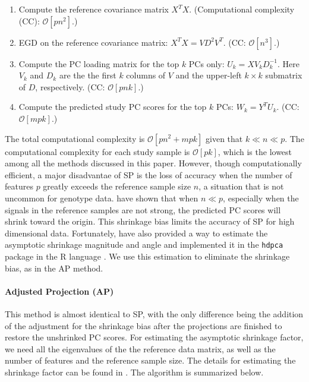 \documentclass{article}
\newcommand{\bO}{\mathcal{O}}
\begin{document}
\begin{enumerate}
\item Compute the reference covariance matrix $X^T X$.
  (Computational complexity (CC): $\bO[pn^2]$.)  
\item EGD on the reference covariance matrix: $X^T X = V D^2 V^T$.
  (CC: $\bO[n^3]$.)
\item Compute the PC loading matrix for the top $k$ PCs only: $U_k= X V_k D_k^{-1}$.
Here $V_k$ and $D_k$
are the the first $k$ columns of $V$
and the upper-left $k \times k$ submatrix of $D$, respectively.
(CC: $\bO[pnk]$.)
\item Compute the predicted study PC scores for the top $k$ PCs: $W_k = Y^T U_k$.
(CC: $\bO[mpk]$.)
\end{enumerate}
The total computational complexity is  $\bO[pn^2 + mpk]$
given that $k \ll n \ll p$.
The computational complexity for each study sample is $\bO[pk]$,
which is the lowest among all the methods discussed in this paper.
However, though computationally efficient,
a major disadvantae of SP is the loss of accuracy when the number of features $p$ greatly exceeds the reference sample size $n$,
a situation that is not uncommon for genotype data.
\citet{dey2016asymptotic} have shown that when $n \ll p$,
especially when the signals in the reference samples are not strong,
the predicted PC scores will shrink toward the origin.
This shrinkage bias limits the accuracy of SP for high dimensional data.
Fortunately, \citet{dey2016asymptotic} have also provided a way
to estimate the asymptotic shrinkage magnitude and angle
and implemented it in the \verb|hdpca| package in the R language \citep{hdpca}.
We use this estimation to eliminate the shrinkage bias,
as in the AP method.

\paragraph{Adjusted Projection (AP)}

This method is almost identical to SP,
with the only difference being the addition of the adjustment for the shrinkage bias
after the projections are finished to restore the unshrinked PC scores.
For estimating the asymptotic shrinkage factor,
we need all the eigenvalues
of the the reference data matrix,
as well as the number of features
and the reference sample size.
The details for estimating the shrinkage factor can be found in \citet{dey2016asymptotic}.
The algorithm is summarized below.
\end{document}

